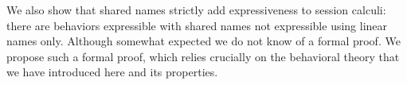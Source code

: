 \smallskip

We also show that shared names strictly add expressiveness to session calculi:
there are behaviors expressible with shared names not expressible using linear names only.
Although somewhat expected we do not know of a formal proof.
We propose such a formal proof, which relies crucially on the behavioral theory that we have introduced here
and its properties.


